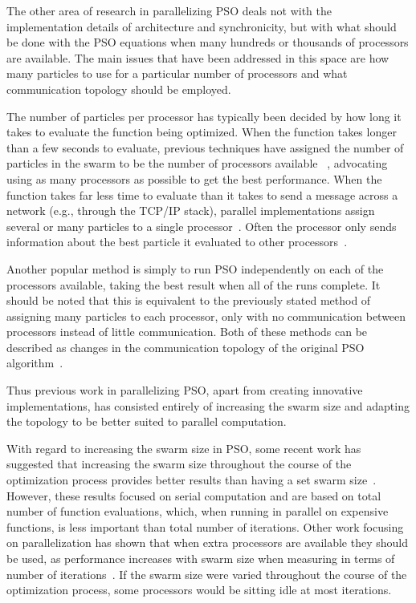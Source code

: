 \documentclass[ms,electronic,twosidetoc,letterpaper,chaptercenter,parttop,equalmargins]{byumsphd}
\begin{document}
The other area of research in parallelizing PSO deals not with the
implementation details of architecture and synchronicity, but with what should
be done with the PSO equations when many hundreds or thousands of processors
are available.  The main issues that have been addressed in this space are how
many particles to use for a particular number of processors and what
communication topology should be employed.

The number of particles per processor has typically been decided by how long it
takes to evaluate the function being optimized.  When the function takes longer
than a few seconds to evaluate, previous techniques have assigned the number of
particles in the swarm to be the number of processors available~%
\citep{jin-2005-pso-antenna-designs,mcnabb-2009-large-particle-swarms},
advocating using as many processors as possible to get the best performance.
When the function takes far less time to evaluate than it takes to send a
message across a network (e.g., through the TCP/IP stack), parallel
implementations assign several or many particles to a single
processor~\citep{chu-2006-intelligent-parallel-pso,
chang-2005-parallel-pso-with-communication-strategies}.  Often the processor
only sends information about the best particle it evaluated to other
processors~\citep{belal-2004-parallel-models-for-pso}.

Another popular method is simply to run PSO independently on each of the
processors available, taking the best result when all of the runs complete.  It
should be noted that this is equivalent to the previously stated method of
assigning many particles to each processor, only with no communication between
processors instead of little communication.  Both of these methods can be
described as changes in the communication topology of the original PSO
algorithm~\citep{mcnabb-2009-large-particle-swarms}.

Thus previous work in parallelizing PSO, apart from creating innovative
implementations, has consisted entirely of increasing the swarm size and
adapting the topology to be better suited to parallel computation.

With regard to increasing the swarm size in PSO, some recent work has suggested
that increasing the swarm size throughout the course of the optimization
process provides better results than having a set swarm
size~\citep{hsieh-2009-efficient-population-utilization-for-pso,
montes-de-oca-2010-incremental-social-learning-pso}.  However, these results
focused on serial computation and are based on total number of function
evaluations, which, when running in parallel on expensive functions, is less
important than total number of iterations.  Other work focusing on
parallelization has shown that when extra processors are available they should
be used, as performance increases with swarm size when measuring in terms of
number of iterations~\citep{mcnabb-2009-large-particle-swarms,
jin-2005-pso-antenna-designs}.  If the swarm size were varied throughout the
course of the optimization process, some processors would be sitting idle at
most iterations.
\end{document}
